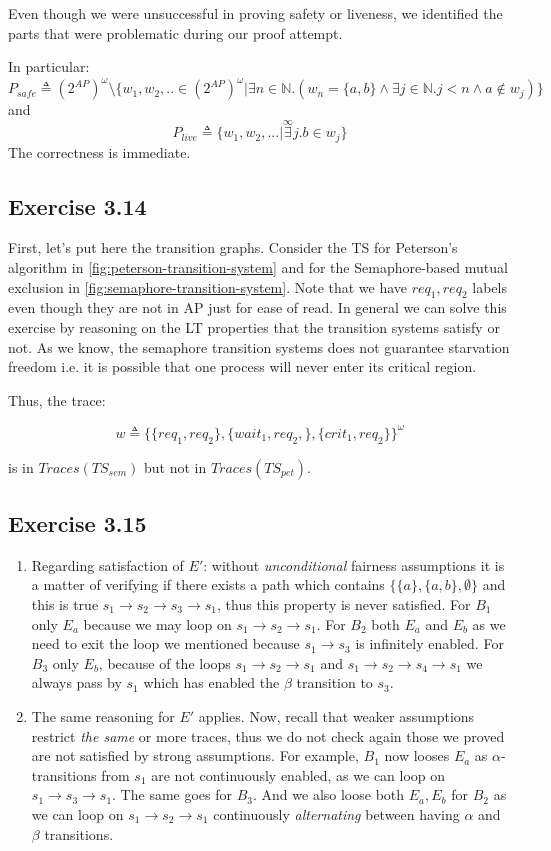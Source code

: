 \documentclass{article}
\begin{document}
	Even though we were unsuccessful in proving safety or liveness, we identified the parts that were problematic during our proof attempt.
	
	In particular:
	$$
	P_{safe} \triangleq (2^{AP})^\omega \setminus  \{w_1,w_2,.. \in (2^{AP})^{\omega} | \exists n \in \mathbb{N}. (w_n = \{a,b\} \land \exists j \in \mathbb{N}. j < n \land a \notin w_j)\}
	$$
	and
	$$
	P_{live} \triangleq \{w_1,w_2,... | \overset{\infty}{\exists} j. b \in w_j\}
	$$
	The correctness is immediate.
	\subsection*{Exercise 3.14}
	First, let's put here the transition graphs.
	Consider the TS for Peterson's algorithm in \autoref{fig:peterson-transition-system} and for the Semaphore-based mutual exclusion in \autoref{fig:semaphore-transition-system}.
	Note that we have $req_1, req_2$ labels even though they are not in AP just for ease of read.
	In general we can solve this exercise by reasoning on the LT properties that the transition systems satisfy or not. As we know, the semaphore transition systems does not guarantee starvation freedom i.e. it is possible that one process will never enter its critical region.
	
	Thus, the trace:
	
	$$
	w \triangleq \{\{req_1, req_2\}, \{wait_1, req_2, \}, \{crit_1, req_2\}\}^{\omega}
	$$
	
	is in $Traces(TS_{sem})$ but not in $Traces(TS_{pet})$.
	\subsection*{Exercise 3.15}
	\begin{enumerate}[label=(\alph*)]
		\item Regarding satisfaction of $E'$: without \textit{unconditional} fairness assumptions it is a matter of verifying if there exists a path which contains $\{\{a\}, \{a,b\}, \emptyset\}$ and this is true $s_1 \rightarrow s_2 \rightarrow s_3 \rightarrow s_1$, thus this property is never satisfied.
		For $B_1$ only $E_a$ because we may loop on $s_1 \rightarrow s_2 \rightarrow s_1$. For $B_2$ both $E_a$ and $E_b$ as we need to exit the loop we mentioned because $s_1 \rightarrow s_3$ is infinitely enabled.
		For $B_3$ only $E_b$, because of the loops $s_1 \rightarrow s_2 \rightarrow s_1$ and $s_1 \rightarrow s_2 \rightarrow s_4 \rightarrow s_1$ we always pass by $s_1$ which has enabled the $\beta$ transition to $s_3$.
		\item The same reasoning for $E'$ applies. Now, recall that weaker assumptions restrict \textit{the same} or more traces, thus we do not check again those we proved are not satisfied by strong assumptions. For example, $B_1$ now looses $E_a$ as $\alpha$-transitions from $s_1$ are not continuously enabled, as we can loop on $s_1 \rightarrow s_3 \rightarrow s_1$. The same goes for $B_3$. And we also loose both $E_a, E_b$ for $B_2$ as we can loop on $s_1 \rightarrow s_2 \rightarrow s_1$ continuously \textit{alternating} between having $\alpha$ and $\beta$ transitions.
	\end{enumerate}
\end{document}
